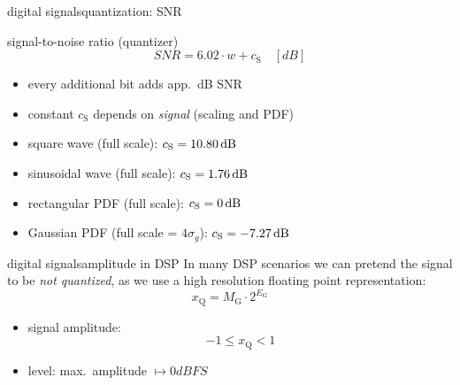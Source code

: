             \begin{frame}{digital signals}{quantization: SNR}
                \toremember{}
                \begin{block}{signal-to-noise ratio (quantizer)}
                    \centering
                    \begin{equation*}
                        SNR = 6.02\cdot w + c_{\mathrm{S}}\quad [dB]
                    \end{equation*}
                    \vspace{-3mm}
                    \begin{itemize}
                        \item	every additional bit adds app.\ \unit[6]{dB} SNR
                        \item	constant $c_{\mathrm{S}}$ depends on \textit{signal} (scaling and PDF)
                    \end{itemize}
                \end{block}
                \pause
                \begin{itemize}
                    \item	square wave (full scale): $c_{\mathrm{S}} =  \unit[10.80]{dB}$
                    \item	sinusoidal wave (full scale): $c_{\mathrm{S}} =  \unit[1.76]{dB}$
                    \item	rectangular {PDF} (full scale): $c_{\mathrm{S}} =  \unit[0]{dB}$
                    \item	Gaussian {PDF} (full scale = $4\sigma_{g}$): $c_{\mathrm{S}} =  \unit[-7.27]{dB}$
                \end{itemize}
            \end{frame}		
               
            \begin{frame}{digital signals}{amplitude in DSP}
                In many DSP scenarios we can pretend the signal to be \textit{not quantized}, as we use a high resolution floating point representation: 
                \begin{equation*}
                    x_{\mathrm{Q}} = M_{\mathrm{G}}\cdot 2^{E_{\mathrm{G}}}
                \end{equation*}
                \begin{itemize}
                    \item<2->	signal amplitude:
                        \begin{equation*}
                            -1 \leq x_{\mathrm{Q}} < 1
                        \end{equation*}
                    \item<3->	level: max.\ amplitude $\mapsto \unit{0}{dBFS}$
                \end{itemize}
            \end{frame}
            
